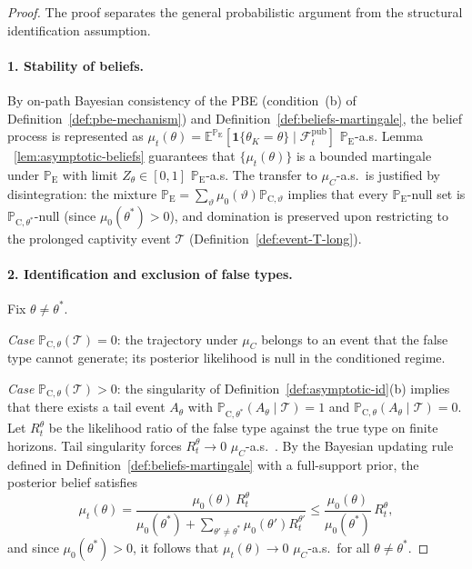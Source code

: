 \documentclass[ecta,nameyear,final,supplement]{econsocart}
\numberwithin{equation}{section}
\numberwithin{table}{section}
\theoremstyle{definition}
\newcommand{\E}{\mathbb{E}}
\newcommand{\ProbE}{\mathbb{P}_{\mathrm{E}}}
\newcommand{\ProbC}[1]{\mathbb{P}_{\mathrm{C},#1}}
\begin{document}
\begin{proof}
The proof separates the general probabilistic argument from the structural
identification assumption.

\paragraph{1. Stability of beliefs.}
By on-path Bayesian consistency of the PBE (condition~(b) of Definition~\ref{def:pbe-mechanism}) and Definition~\ref{def:beliefs-martingale}, the belief process is represented as
$\mu_t(\theta)=\E^{\ProbE}[\mathbf{1}\{\theta_K=\theta\}\mid
\mathcal{F}_t^{\mathrm{pub}}]$ $\ProbE$-a.s. Lemma
~\ref{lem:asymptotic-beliefs} guarantees that $\{\mu_t(\theta)\}$ is a
bounded martingale under $\ProbE$ with limit $Z_\theta\in[0,1]$ $\ProbE$-a.s. The
transfer to $\mu_C$-a.s.\ is justified by disintegration: the mixture
$\ProbE=\sum_\vartheta\mu_0(\vartheta)\ProbC{\vartheta}$ implies that every
$\ProbE$-null set is $\ProbC{\theta^\ast}$-null (since
$\mu_0(\theta^\ast)>0$), and domination is preserved upon restricting to
the prolonged captivity event $\mathcal{T}$ (Definition~\ref{def:event-T-long}).

\paragraph{2. Identification and exclusion of false types.}
Fix $\theta\neq\theta^\ast$.

\emph{Case} $\ProbC{\theta}(\mathcal{T})=0$: the trajectory under $\mu_C$
belongs to an event that the false type cannot generate; its posterior
likelihood is null in the conditioned regime.

\emph{Case} $\ProbC{\theta}(\mathcal{T})>0$: the singularity of
Definition~\ref{def:asymptotic-id}(b) implies that there exists a tail event
$A_\theta$ with
$\ProbC{\theta^\ast}(A_\theta\mid\mathcal{T})=1$ and
$\ProbC{\theta}(A_\theta\mid\mathcal{T})=0$.
Let $R_t^\theta$ be the likelihood ratio of the false type against the true
type on finite horizons. Tail singularity forces
$R_t^\theta\to 0$ $\mu_C$-a.s.\
\citep{BlackwellDubins1962,Schervish1995Theory}.
By the Bayesian updating rule defined in Definition~\ref{def:beliefs-martingale} with a full-support prior, the posterior belief satisfies
\[
\mu_t(\theta)
=\frac{\mu_0(\theta)\,R_t^\theta}
      {\mu_0(\theta^\ast)+\sum_{\theta'\neq\theta^\ast}\mu_0(\theta')R_t^{\theta'}}
\le\frac{\mu_0(\theta)}{\mu_0(\theta^\ast)}\,R_t^\theta,
\]
and since $\mu_0(\theta^\ast)>0$, it follows that
$\mu_t(\theta)\to 0$ $\mu_C$-a.s.\ for all $\theta\neq\theta^\ast$.


\end{proof}
\end{document}
